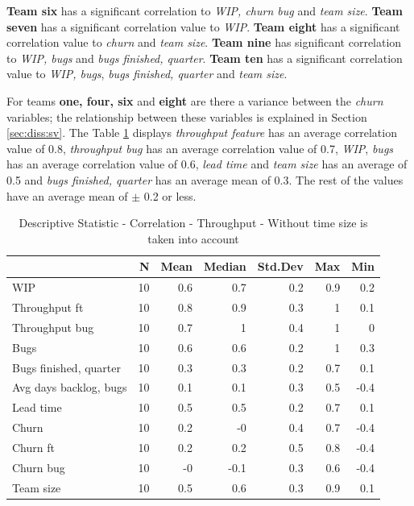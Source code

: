 \documentclass[UKenglish]{ifimaster}  %
\begin{document}
\textbf{Team six} has a significant correlation to \textit{WIP, churn bug} and \textit{team size}. \textbf{Team seven} has a significant correlation value to \textit{WIP}. \textbf{Team eight} has a significant correlation value to \textit{churn} and \textit{team size}. \textbf{Team nine} has significant correlation to \textit{WIP, bugs} and \textit{bugs finished, quarter}. \textbf{Team ten} has a significant correlation value to \textit{WIP, bugs}, \textit{bugs finished, quarter} and \textit{team size}. 


For teams \textbf{one, four, six} and \textbf{eight} are there a variance between the \textit{churn} variables; the relationship between these variables is explained in Section \ref{sec:diss:sv}.
The Table \ref{DS:corr:TP} displays \textit{throughput feature} has an average correlation value of 0.8, \textit{throughput bug} has an average correlation value of 0.7, \textit{WIP}, \textit{bugs} has an average correlation value of 0.6, \textit{lead time} and \textit{team size} has an average of 0.5 and \textit{bugs finished, quarter} has an average mean of 0.3. The rest of the values have an average mean of $\pm$ 0.2 or less.
\begin{table}[!htbp]
 \centering
 \begin{tabular}{ | l | r | r | r | r | r | r | }
 \hline
& \bf{N} & \bf{Mean} & \bf{Median} & \bf{Std.Dev} & \bf{Max} & \bf{Min} \\ \hline
WIP  & 10 & 0.6 & 0.7 & 0.2 & 0.9 & 0.2\\ \hline
Throughput ft  & 10 & 0.8 & 0.9 & 0.3 & 1 & 0.1\\ \hline
Throughput bug  & 10 & 0.7 & 1 & 0.4 & 1 & 0\\ \hline
Bugs  & 10 & 0.6 & 0.6 & 0.2 & 1 & 0.3\\ \hline
Bugs finished, quarter  & 10 & 0.3 & 0.3 & 0.2 & 0.7 & 0.1\\ \hline
Avg days backlog, bugs  & 10 & 0.1 & 0.1 & 0.3 & 0.5 & -0.4\\ \hline
Lead time & 10 & 0.5 & 0.5 & 0.2 & 0.7 & 0.1\\ \hline
Churn  & 10 & 0.2 & -0 & 0.4 & 0.7 & -0.4\\ \hline
Churn ft  & 10 & 0.2 & 0.2 & 0.5 & 0.8 & -0.4\\ \hline
Churn bug  & 10 & -0 & -0.1 & 0.3 & 0.6 & -0.4\\ \hline
Team size  & 10 & 0.5 & 0.6 & 0.3 & 0.9 & 0.1\\ \hline
\end{tabular}
 \caption{Descriptive Statistic - Correlation - Throughput - Without time size is taken into account}
 \label{DS:corr:TP}
 \end{table}
 \newpage
 
\end{document}
